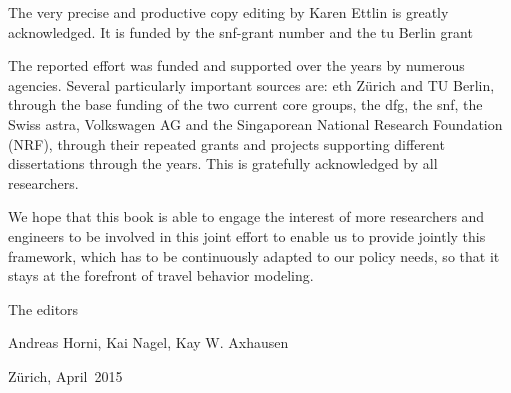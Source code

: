The very precise and productive copy editing by Karen Ettlin is greatly acknowledged. It is funded by the \gls{snf}-grant number  and the \gls{tu} Berlin grant 

The reported effort was funded and supported over the years by numerous agencies. Several particularly important sources are: \gls{eth} Zürich and TU Berlin, through the base funding of the two current core groups, the \gls{dfg}, the \gls{snf}, the Swiss \gls{astra}, Volkswagen AG and the Singaporean National Research Foundation (NRF), through their repeated grants and projects supporting different dissertations through the years. This is gratefully acknowledged by all researchers. 

We hope that this book is able to engage the interest of more researchers and engineers to be involved in this joint effort to enable us to provide jointly this \gls{framework}, which has to be continuously adapted to our policy needs, so that it stays at the forefront of travel behavior modeling.

The editors

Andreas Horni, 	Kai Nagel,	Kay W. Axhausen


Zürich, April~2015

